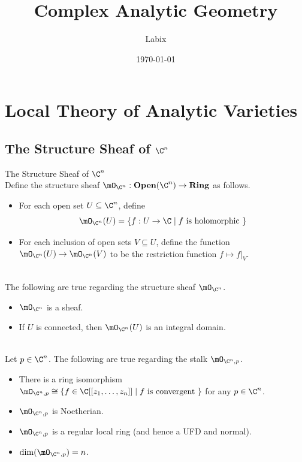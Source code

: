 \documentclass[a4paper]{article}
\title{Complex Analytic Geometry}
\author{Labix}
\date{\today}
\begin{document}
\maketitle
\begin{abstract}
\end{abstract}
\pagebreak
\tableofcontents

\pagebreak
\section{Local Theory of Analytic Varieties}
\subsection{The Structure Sheaf of $\C^n$}
\begin{defn}{The Structure Sheaf of $\C^n$}{}\\
Define the structure sheaf $\mO_{\C^n}:\bold{Open}(\C^n)\to\bold{Ring}$ as follows. 
\begin{itemize}
\item For each open set $U\subseteq\C^n$, define $$\mO_{\C^n}(U)=\{f:U\to\C\;|\;f\text{ is holomorphic }\}$$
\item For each inclusion of open sets $V\subseteq U$, define the function $\mO_{\C^n}(U)\to\mO_{\C^n}(V)$ to be the restriction function $f\mapsto f|_V$. 
\end{itemize}
\end{defn}

\begin{prp}{}{}\\
The following are true regarding the structure sheaf $\mO_{\C^n}$. 
\begin{itemize}
\item $\mO_{\C^n}$ is a sheaf. 
\item If $U$ is connected, then $\mO_{\C^n}(U)$ is an integral domain. 
\end{itemize}
\end{prp}

\begin{prp}{}{}\\
Let $p\in\C^n$. The following are true regarding the stalk $\mO_{\C^n,p}$. 
\begin{itemize}
\item There is a ring isomorphism $\mO_{\C^n,p}\cong\{f\in\C[[z_1,\dots,z_n]]\;|\;f\text{ is convergent }\}$ for any $p\in\C^n$. 
\item $\mO_{\C^n,p}$ is Noetherian. 
\item $\mO_{\C^n,p}$ is a regular local ring (and hence a UFD and normal). 
\item $\dim(\mO_{\C^n,p})=n$. 
\end{itemize}
\end{prp}
\end{document}
